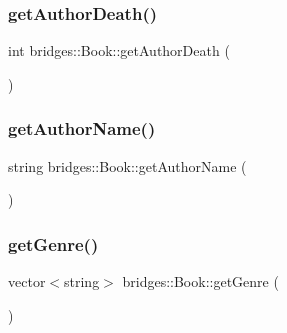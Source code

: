 \hypertarget{classbridges_1_1_book_a73014b2bb34b951d5ce5b4223c9fec8d}{}\label{classbridges_1_1_book_a73014b2bb34b951d5ce5b4223c9fec8d} 
\subsubsection{\texorpdfstring{get\+Author\+Death()}{getAuthorDeath()}}
{\footnotesize\ttfamily int bridges\+::\+Book\+::get\+Author\+Death (\begin{DoxyParamCaption}{ }\end{DoxyParamCaption})\hspace{0.3cm}{\ttfamily [inline]}}

\hypertarget{classbridges_1_1_book_a0204002c3242950404f348d5c5016693}{}\label{classbridges_1_1_book_a0204002c3242950404f348d5c5016693} 
\subsubsection{\texorpdfstring{get\+Author\+Name()}{getAuthorName()}}
{\footnotesize\ttfamily string bridges\+::\+Book\+::get\+Author\+Name (\begin{DoxyParamCaption}{ }\end{DoxyParamCaption})\hspace{0.3cm}{\ttfamily [inline]}}

\hypertarget{classbridges_1_1_book_ac3c2724781fdd331946a1c2eb7c3d9b7}{}\label{classbridges_1_1_book_ac3c2724781fdd331946a1c2eb7c3d9b7} 
\subsubsection{\texorpdfstring{get\+Genre()}{getGenre()}}
{\footnotesize\ttfamily vector$<$string$>$ bridges\+::\+Book\+::get\+Genre (\begin{DoxyParamCaption}{ }\end{DoxyParamCaption})\hspace{0.3cm}{\ttfamily [inline]}}

\hypertarget{classbridges_1_1_book_afe447c2884d59df17bed7ba2a4dc38a9}{}\label{classbridges_1_1_book_afe447c2884d59df17bed7ba2a4dc38a9} 
